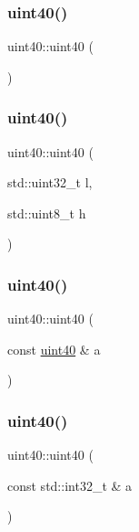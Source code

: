 \subsubsection{\texorpdfstring{uint40()}{uint40()}\hspace{0.1cm}{\footnotesize\ttfamily [1/7]}}
{\footnotesize\ttfamily uint40\+::uint40 (\begin{DoxyParamCaption}{ }\end{DoxyParamCaption})\hspace{0.3cm}{\ttfamily [inline]}}

\mbox{\label{classuint40_a06f45dcc09d7533278c5fefbf7085440}} 
\subsubsection{\texorpdfstring{uint40()}{uint40()}\hspace{0.1cm}{\footnotesize\ttfamily [2/7]}}
{\footnotesize\ttfamily uint40\+::uint40 (\begin{DoxyParamCaption}\item[{std\+::uint32\+\_\+t}]{l,  }\item[{std\+::uint8\+\_\+t}]{h }\end{DoxyParamCaption})\hspace{0.3cm}{\ttfamily [inline]}}

\mbox{\label{classuint40_ab359a2f13e4d14944ae6ba3245d71ef3}} 
\subsubsection{\texorpdfstring{uint40()}{uint40()}\hspace{0.1cm}{\footnotesize\ttfamily [3/7]}}
{\footnotesize\ttfamily uint40\+::uint40 (\begin{DoxyParamCaption}\item[{const \hyperlink{classuint40}{uint40} \&}]{a }\end{DoxyParamCaption})\hspace{0.3cm}{\ttfamily [inline]}}

\mbox{\label{classuint40_ad4165899ffb9045026ba833e5b8bc347}} 
\subsubsection{\texorpdfstring{uint40()}{uint40()}\hspace{0.1cm}{\footnotesize\ttfamily [4/7]}}
{\footnotesize\ttfamily uint40\+::uint40 (\begin{DoxyParamCaption}\item[{const std\+::int32\+\_\+t \&}]{a }\end{DoxyParamCaption})\hspace{0.3cm}{\ttfamily [inline]}}

